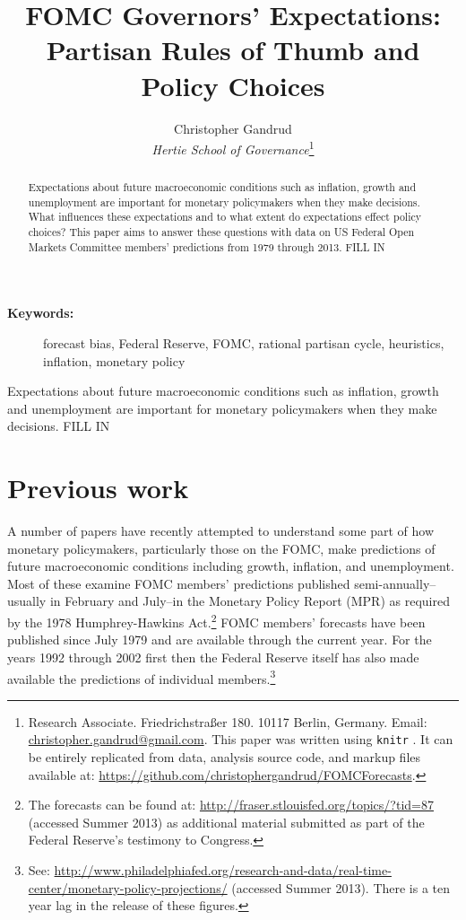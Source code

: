 \documentclass[a4paper]{article}\usepackage{graphicx, color}
\title{FOMC Governors' Expectations: Partisan Rules of Thumb and Policy Choices}
\author{Christopher Gandrud \\
                {\emph{Hertie School of Governance}}\footnote{Research Associate. Friedrichstra{\ss}er 180. 10117 Berlin, Germany. Email: \href{mailto:christopher.gandrud@gmail.com}{christopher.gandrud@gmail.com}. This paper was written using {\tt{knitr}} \citep{R-knitr}. It can be entirely replicated from data, analysis source code, and markup files available at: {\url{https://github.com/christophergandrud/FOMCForecasts}}.}}
\begin{document}
\maketitle

\begin{abstract}
    Expectations about future macroeconomic conditions such as inflation, growth and unemployment are important for monetary policymakers when they make decisions. What influences these expectations and to what extent do expectations effect policy choices? This paper aims to answer these questions with data on US Federal Open Markets Committee members' predictions from 1979 through 2013. FILL IN
\end{abstract}

\begin{description}
  \item [{\textbf{Keywords:}}] forecast bias, Federal Reserve, FOMC, rational partisan cycle, heuristics, inflation, monetary policy
\end{description}


Expectations about future macroeconomic conditions such as inflation, growth and unemployment are important for monetary policymakers when they make decisions. FILL IN

\section{Previous work}

A number of papers have recently attempted to understand some part of how monetary policymakers, particularly those on the FOMC, make predictions of future macroeconomic conditions including growth, inflation, and unemployment. Most of these examine FOMC members' predictions published semi-annually--usually in February and July--in the Monetary Policy Report (MPR) as required by the 1978  Humphrey-Hawkins Act.\footnote{The forecasts can be found at: \url{http://fraser.stlouisfed.org/topics/?tid=87} (accessed Summer 2013) as additional material submitted as part of the Federal Reserve's testimony to Congress.} FOMC members' forecasts have been published since July 1979 and are available through the current year. For the years 1992 through 2002 first \cite{Romer2010Data} then the Federal Reserve itself has also made available the predictions of individual members.\footnote{See: \url{http://www.philadelphiafed.org/research-and-data/real-time-center/monetary-policy-projections/} (accessed Summer 2013). There is a ten year lag in the release of these figures.}
\end{document}

